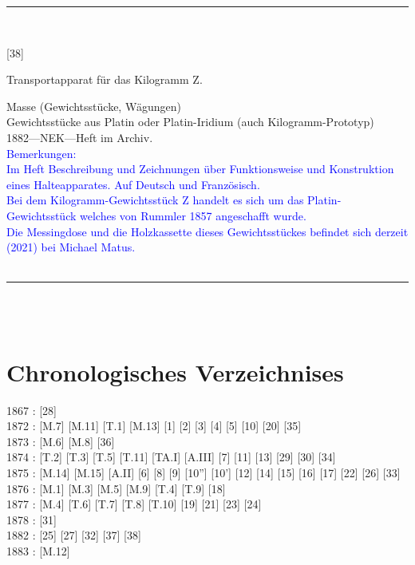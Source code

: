 \parbox{\textwidth}{%
\rule{\textwidth}{1pt}\vspace*{-3mm}\\
\begin{minipage}[t]{0.15\textwidth}\vspace{0pt}
\Huge\rule[-4mm]{0cm}{1cm}[38]
\end{minipage}
\hfill
\begin{minipage}[t]{0.85\textwidth}\vspace{0pt}
\large Transportapparat für das Kilogramm {\glqq}Z{\grqq}.\rule[-2mm]{0mm}{2mm}
\end{minipage}
{\footnotesize\flushright
Masse (Gewichtsstücke, Wägungen)\\
Gewichtsstücke aus Platin oder Platin-Iridium (auch Kilogramm-Prototyp)\\
}
1882\quad---\quad NEK\quad---\quad Heft im Archiv.\\
\textcolor{blue}{Bemerkungen:\\{}
Im Heft Beschreibung und Zeichnungen über Funktionsweise und Konstruktion eines Halteapparates. Auf Deutsch und Französisch.\\{}
Bei dem Kilogramm-Gewichtsstück {\glqq}Z{\grqq} handelt es sich um das Platin-Gewichtsstück welches von Rummler 1857 angeschafft wurde.\\{}
Die Messingdose und die Holzkassette dieses Gewichtsstückes befindet sich derzeit (2021) bei Michael Matus.\\{}
}
\\[-15pt]
\rule{\textwidth}{1pt}
}
\\
\vspace*{-2.5pt}\\

\chapter{Chronologisches Verzeichnises}
1867 : [28]
\\{}
1872 : [M.7] [M.11] [T.1] [M.13] [1] [2] [3] [4] [5] [10] [20] [35]
\\{}
1873 : [M.6] [M.8] [36]
\\{}
1874 : [T.2] [T.3] [T.5] [T.11] [TA.I] [A.III] [7] [11] [13] [29] [30] [34]
\\{}
1875 : [M.14] [M.15] [A.II] [6] [8] [9] [10''] [10'] [12] [14] [15] [16] [17] [22] [26] [33]
\\{}
1876 : [M.1] [M.3] [M.5] [M.9] [T.4] [T.9] [18]
\\{}
1877 : [M.4] [T.6] [T.7] [T.8] [T.10] [19] [21] [23] [24]
\\{}
1878 : [31]
\\{}
1882 : [25] [27] [32] [37] [38]
\\{}
1883 : [M.12]
\\{}



